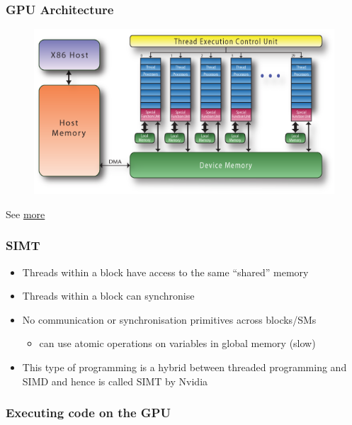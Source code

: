 \subsubsection{GPU Architecture}\label{gpu-architecture}

\begin{figure}[htbp]
\centering
\includegraphics{97Accelerators/figures/pgi-nvidia-block-diagram.png}
\end{figure}

See
\href{http://www.gris.informatik.tu-darmstadt.de/cuda-workshop/tutorial/Advanced_CUDA_01.pdf}{more}

\subsubsection{SIMT}\label{simt}

\begin{itemize}
\itemsep1pt\parskip0pt
\item
  Threads within a block have access to the same ``shared'' memory
\item
  Threads within a block can synchronise
\item
  No communication or synchronisation primitives across blocks/SMs

  \begin{itemize}
  \itemsep1pt\parskip0pt
  \item
    can use atomic operations on variables in global memory (slow)
  \end{itemize}
\item
  This type of programming is a hybrid between threaded programming and
  SIMD and hence is called SIMT by Nvidia
\end{itemize}

\subsubsection{Executing code on the
GPU}\label{executing-code-on-the-gpu}

